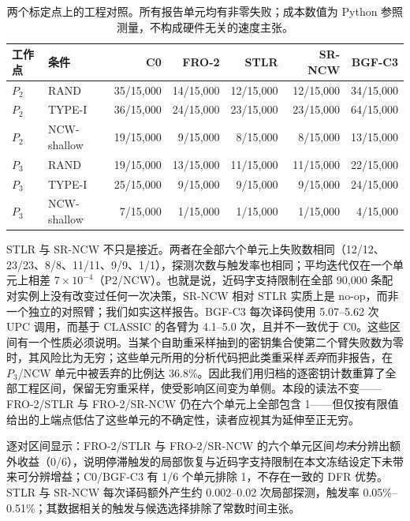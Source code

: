 \documentclass[UTF8,a4paper,10pt,twocolumn]{ctexart}
\begin{document}
\begin{table}[t]
\centering
\caption{两个标定点上的工程对照。所有报告单元均有非零失败；成本数值为 Python 参照测量，不构成硬件无关的速度主张。}
\label{tab:eng}
\begin{tabular}{@{}llrrrrr@{}}
\toprule
工作点 & 条件 & C0 & FRO-2 & STLR & SR-NCW & BGF-C3 \\
\midrule
$P_2$ & RAND        & 35/15{,}000 & 14/15{,}000 & 12/15{,}000 & 12/15{,}000 & 34/15{,}000 \\
$P_2$ & TYPE-I      & 36/15{,}000 & 24/15{,}000 & 23/15{,}000 & 23/15{,}000 & 64/15{,}000 \\
$P_2$ & NCW-shallow & 19/15{,}000 & 9/15{,}000  & 8/15{,}000  & 8/15{,}000  & 13/15{,}000 \\
$P_3$ & RAND        & 19/15{,}000 & 13/15{,}000 & 11/15{,}000 & 11/15{,}000 & 22/15{,}000 \\
$P_3$ & TYPE-I      & 25/15{,}000 & 9/15{,}000  & 9/15{,}000  & 9/15{,}000  & 24/15{,}000 \\
$P_3$ & NCW-shallow & 7/15{,}000  & 1/15{,}000  & 1/15{,}000  & 1/15{,}000  & 4/15{,}000 \\
\bottomrule
\end{tabular}
\end{table}

STLR 与 SR-NCW 不只是接近。两者在全部六个单元上失败数相同（12/12、23/23、8/8、11/11、9/9、1/1），探测次数与触发率也相同；平均迭代仅在一个单元上相差 $7\times10^{-4}$（P2/NCW）。也就是说，近码字支持限制在全部 90{,}000 条配对实例上没有改变过任何一次决策，SR-NCW 相对 STLR 实质上是 no-op，而非一个独立的对照臂；我们如实这样报告。BGF-C3 每次译码使用 5.07--5.62 次 UPC 调用，而基于 CLASSIC 的各臂为 4.1--5.0 次，且并不一致优于 C0。这些区间有一个性质必须说明。当某个自助重采样抽到的密钥集合使第二个臂失败数为零时，其风险比为无穷；这些单元所用的分析代码把此类重采样\emph{丢弃}而非报告，在 $P_3$/NCW 单元中被丢弃的比例达 36.8\%。因此我们用归档的逐密钥计数重算了全部工程区间，保留无穷重采样，使受影响区间变为单侧。本段的读法不变——FRO-2/STLR 与 FRO-2/SR-NCW 仍在六个单元上全部包含 1——但仅按有限值给出的上端点低估了这些单元的不确定性，读者应视其为延伸至正无穷。

逐对区间显示：FRO-2/STLR 与 FRO-2/SR-NCW 的六个单元区间\emph{均未}分辨出额外收益（0/6），说明停滞触发的局部恢复与近码字支持限制在本文冻结设定下未带来可分辨增益；C0/BGF-C3 有 1/6 个单元排除 1，不存在一致的 DFR 优势。STLR 与 SR-NCW 每次译码额外产生约 0.002--0.02 次局部探测，触发率 0.05\%--0.51\%；其数据相关的触发与候选选择排除了常数时间主张。
\end{document}

